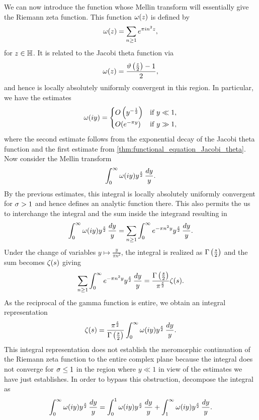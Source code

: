     We can now introduce the function whose Mellin transform will essentially give the Riemann zeta function. This function \(\omega(z)\) is defined by
    \[
      \omega(z) = \sum_{n \ge 1}e^{\pi in^{2}z},
    \]
    for \(z \in \mathbb{H}\). It is related to the Jacobi theta function via
    \[
      \omega(z) = \frac{\vartheta\left(\frac{z}{2}\right)-1}{2},
    \]
    and hence is locally absolutely uniformly convergent in this region. In particular, we have the estimates
    \[
      \omega(iy) = \begin{cases} O\left(y^{-\frac{1}{2}}\right) & \text{if \(y \ll 1\)}, \\ O(e^{-\pi y}) & \text{if \(y \gg 1\)}, \end{cases}
    \]
    where the second estimate follows from the exponential decay of the Jacobi theta function and the first estimate from \cref{thm:functional_equation_Jacobi_theta}. Now consider the Mellin transform
    \[
      \int_{0}^{\infty}\omega(iy)y^{\frac{s}{2}}\,\frac{dy}{y}.
    \]
    By the previous estimates, this integral is locally absolutely uniformly convergent for \(\sigma > 1\) and hence defines an analytic function there. This also permits the us to interchange the integral and the sum inside the integrand resulting in
    \[
      \int_{0}^{\infty}\omega(iy)y^{\frac{s}{2}}\,\frac{dy}{y} = \sum_{n \ge 1}\int_{0}^{\infty}e^{-\pi n^{2}y}y^{\frac{s}{2}}\,\frac{dy}{y}.
    \]
    Under the change of variables \(y \mapsto \frac{y}{\pi n^{2}}\), the integral is realized as \(\Gamma\left(\frac{s}{2}\right)\) and the sum becomes \(\zeta(s)\) giving
    \[
      \sum_{n \ge 1}\int_{0}^{\infty}e^{-\pi n^{2}y}y^{\frac{s}{2}}\,\frac{dy}{y} = \frac{\Gamma\left(\frac{s}{2}\right)}{\pi^{\frac{s}{2}}}\zeta(s).
    \]
    As the reciprocal of the gamma function is entire, we obtain an integral representation
    \begin{equation}\label{equ:integral_representation_zeta_1}
      \zeta(s) = \frac{\pi^{\frac{s}{2}}}{\Gamma\left(\frac{s}{2}\right)}\int_{0}^{\infty}\omega(iy)y^{\frac{s}{2}}\,\frac{dy}{y}.
    \end{equation}
    This integral representation does not establish the meromorphic continuation of the Riemann zeta function to the entire complex plane because the integral does not converge for \(\sigma \le 1\) in the region where \(y \ll 1\) in view of the estimates we have just establishes. In order to bypass this obstruction, decompose the integral as
    \begin{equation}\label{equ:symmetric_integral_zeta_split}
      \int_{0}^{\infty}\omega(iy)y^{\frac{s}{2}}\,\frac{dy}{y} = \int_{0}^{1}\omega(iy)y^{\frac{s}{2}}\,\frac{dy}{y}+\int_{1}^{\infty}\omega(iy)y^{\frac{s}{2}}\,\frac{dy}{y}.
    \end{equation}
